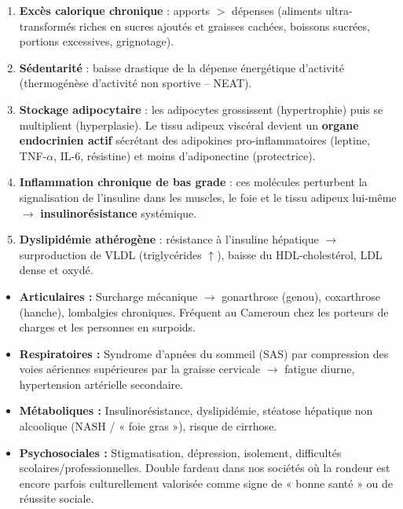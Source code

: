 \documentclass[11pt]{article}
\begin{document}
\begin{methode}
\begin{enumerate}
    \item \textbf{Excès calorique chronique} : apports $>$ dépenses (aliments ultra-transformés riches en sucres ajoutés et graisses cachées, boissons sucrées, portions excessives, grignotage).
    \item \textbf{Sédentarité} : baisse drastique de la dépense énergétique d'activité (thermogénèse d'activité non sportive -- NEAT).
    \item \textbf{Stockage adipocytaire} : les adipocytes grossissent (hypertrophie) puis se multiplient (hyperplasie). Le tissu adipeux viscéral devient un \textbf{organe endocrinien actif} sécrétant des adipokines pro-inflammatoires (leptine, TNF-$\alpha$, IL-6, résistine) et moins d'adiponectine (protectrice).
    \item \textbf{Inflammation chronique de bas grade} : ces molécules perturbent la signalisation de l'insuline dans les muscles, le foie et le tissu adipeux lui-même $\rightarrow$ \textbf{insulinorésistance} systémique.
    \item \textbf{Dyslipidémie athérogène} : résistance à l'insuline hépatique $\rightarrow$ surproduction de VLDL (triglycérides $\uparrow$), baisse du HDL-cholestérol, LDL dense et oxydé.
\end{enumerate}
\end{methode}

\begin{exemplebox}
\begin{itemize}
    \item \textbf{Articulaires :} Surcharge mécanique $\rightarrow$ gonarthrose (genou), coxarthrose (hanche), lombalgies chroniques. Fréquent au Cameroun chez les porteurs de charges et les personnes en surpoids.
    \item \textbf{Respiratoires :} Syndrome d'apnées du sommeil (SAS) par compression des voies aériennes supérieures par la graisse cervicale $\rightarrow$ fatigue diurne, hypertension artérielle secondaire.
    \item \textbf{Métaboliques :} Insulinorésistance, dyslipidémie, stéatose hépatique non alcoolique (NASH / « foie gras »), risque de cirrhose.
    \item \textbf{Psychosociales :} Stigmatisation, dépression, isolement, difficultés scolaires/professionnelles. Double fardeau dans nos sociétés où la rondeur est encore parfois culturellement valorisée comme signe de « bonne santé » ou de réussite sociale.
\end{itemize}
\end{exemplebox}
\end{document}
